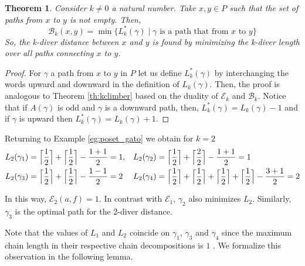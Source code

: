 \documentclass{article}[12pt]
\theoremstyle{exampstyle}
\newtheorem{theorem}{Theorem}[section]
\theoremstyle{remark}
\newcommand{\B}{\mathcal{B}}
\newcommand{\E}{\mathcal{E}}
\DeclarePairedDelimiter{\ceil}{\lceil}{\rceil}
\newcommand{\myceil}[2][k]{\ceil[\Big]{\frac{#2 }{#1}}}
\begin{document}
\begin{theorem}
   Consider $k \neq 0$ a natural number. Take $x,y \in P $ such that the set of paths from $x$ to $y$ is not empty. Then, \[\B_k(x,y) = \min \{ L^*_k(\gamma) \mid \gamma \text { is a path that from } x \text{ to } y\} \]
   So, the k-diver distance between $x$ and $y$ is found by minimizing the  k-diver length over all paths connecting $x$ to $y$. 
    \label{th:kdiver}
\end{theorem}
\begin{proof}
    For $\gamma$ a path from $x$ to $y$ in $P$  let us define $L^*_k(\gamma)$ by interchanging the words upward and downward in the definition of $L_k(\gamma)$. Then, the proof is analogous to Theorem \ref{th:kclimber} based on the duality of $\E_k$ and $\B_k$. Notice that if $A(\gamma)$ is odd and $\gamma$ is a downward path, then, $L^*_k(\gamma) = L_k(\gamma) - 1$ and if $\gamma$ is upward then  $L^*_k(\gamma) = L_k(\gamma) + 1$. 
   
\end{proof}

Returning to Example \ref{eg:poset_gato} we obtain for $k=2$
\begin{align*}
    L_2(\gamma_1) &= \myceil[2]{1} +  \myceil[2]{1} - \frac{1+1}{2} =  1,  &L_2(\gamma_2) &= \myceil[2]{1} +  \myceil[2]{2} - \frac{1+1}{2} =  1 \\
    L_2(\gamma_3) &= \myceil[2]{1} +  \myceil[2]{1} - \frac{1-1}{2} =  2 &L_2(\gamma_4) &= \myceil[2]{1} +  \myceil[2]{1} + \myceil[2]{1} +  \myceil[2]{1} - \frac{3+1}{2} =  2
\end{align*}

In this way, $\E_2(a,f) = 1$. In contrast with $\E_1$, $\gamma_2$ also minimizes $L_2$. Similarly, $\gamma_3$ is the optimal path for the 2-diver distance.

Note that the values of $L_1$ and $L_2$ coincide on $\gamma_1$, $\gamma_3$ and $\gamma_4$ since the maximum chain length in their respective chain decompositions is $1$ . We formalize this observation in the following lemma.
\end{document}
